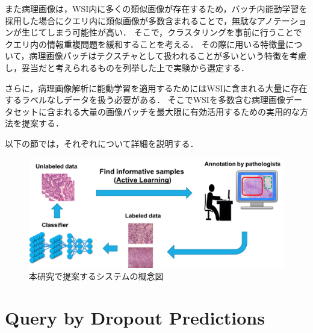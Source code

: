 また病理画像は，WSI内に多くの類似画像が存在するため，バッチ内能動学習を採用した場合にクエリ内に類似画像が多数含まれることで，無駄なアノテーションが生じてしまう可能性が高い．
そこで，クラスタリングを事前に行うことでクエリ内の情報重複問題を緩和することを考える．
その際に用いる特徴量について，病理画像パッチはテクスチャとして扱われることが多いという特徴を考慮し，妥当だと考えられるものを列挙した上で実験から選定する．

さらに，病理画像解析に能動学習を適用するためにはWSIに含まれる大量に存在するラベルなしデータを扱う必要がある．
そこでWSIを多数含む病理画像データセットに含まれる大量の画像パッチを最大限に有効活用するための実用的な方法を提案する．

以下の節では，それぞれについて詳細を説明する．

\begin{figure}[tbp]
    \label{fig:overview}
     \begin{center}
      \includegraphics[width=120mm]{figures/overview.png}
     \end{center}
    \caption{本研究で提案するシステムの概念図}
\end{figure}

\section{\textbf{Query by Dropout Predictions}}
